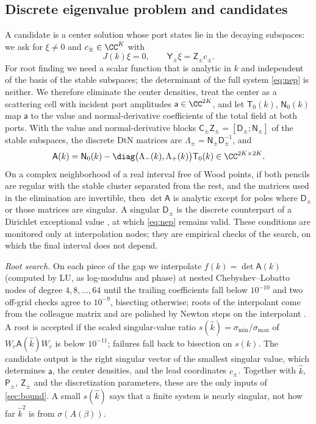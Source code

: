 \subsection{Discrete eigenvalue problem and candidates}\label{sec:nep}
A candidate is a center solution whose port states lie in the decaying
subspaces: we ask for $\xi\ne0$ and $c_\pm\in\CC^K$ with
\begin{equation}\label{eq:nep}
  J(k)\xi=0,\qquad \mathsf Y_\pm\xi=\mathsf Z_\pm c_\pm .
\end{equation}
For root finding we need a scalar function that is analytic in $k$ and
independent of the basis of the stable subspaces; the determinant of the full
system \eqref{eq:nep} is neither. We therefore eliminate the center densities,
treat the center as a scattering cell with incident port amplitudes $\mathsf a\in\CC^{2K}$,
and let $\mathsf T_0(k)$, $\mathsf N_0(k)$ map $\mathsf a$ to the value and
normal-derivative coefficients of the total field at both ports. With the value
and normal-derivative blocks $\mathsf C_\pm\mathsf Z_\pm=[\mathsf D_\pm;\mathsf N_\pm]$
of the stable subspaces, the discrete DtN matrices are
$\Lambda_\pm=\mathsf N_\pm\mathsf D_\pm^{-1}$, and
\begin{equation}\label{eq:port-matrix}
  \mathsf A(k)=\mathsf N_0(k)-\diag\bigl(\Lambda_-(k),\Lambda_+(k)\bigr)\mathsf T_0(k)
  \in\CC^{2K\times2K}.
\end{equation}
On a complex neighborhood of a real interval free of Wood points, if both pencils
are regular with the stable cluster separated from the rest, and the matrices
used in the elimination are invertible, then $\det\mathsf A$ is analytic except
for poles where $\mathsf D_\pm$ or those matrices are singular. A singular
$\mathsf D_\pm$ is the discrete counterpart of a Dirichlet exceptional value
\cite[Thm.~4.1]{Fliss2013}, at which \eqref{eq:nep} remains valid. These conditions are monitored only at
interpolation nodes; they are empirical checks of the search, on which the final
interval does not depend.

\emph{Root search.} On each piece of the gap we interpolate $f(k)=\det\mathsf A(k)$
(computed by LU, as log-modulus and phase) at nested Chebyshev--Lobatto nodes of
degree $4,8,\dots,64$ until the trailing coefficients fall below $10^{-10}$ and two
off-grid checks agree to $10^{-9}$, bisecting otherwise; roots of the interpolant
come from the colleague matrix and are polished by Newton steps on the
interpolant \cite{Boyd2002,ZhaoBarnett2015}. A root is accepted if the scaled
singular-value ratio $s(\widehat k)=\sigma_{\min}/\sigma_{\max}$ of
$W_r\mathsf A(\widehat k)W_c$ is below $10^{-11}$; failures fall back to bisection
on $s(k)$. The candidate output is the right singular vector of the smallest
singular value, which determines $\mathsf a$, the center densities, and the lead
coordinates $c_\pm$. Together with $\widehat k$, $\mathsf P_\pm$, $\mathsf Z_\pm$
and the discretization parameters, these are the only inputs of
\cref{sec:bound}. A small $s(\widehat k)$ says that a finite system is nearly
singular, not how far $\widehat k^2$ is from $\sigma(A(\beta))$.
